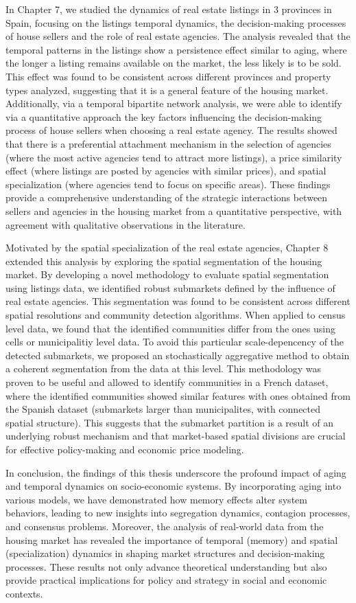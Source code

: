 In Chapter 7, we studied the dynamics of real estate listings in 3 provinces in Spain, focusing on the listings temporal dynamics, the decision-making processes of house sellers and the role of real estate agencies. The analysis revealed that the temporal patterns in the listings show a persistence effect similar to aging, where the longer a listing remains available on the market, the less likely is to be sold. This effect was found to be consistent across different provinces and property types analyzed, suggesting that it is a general feature of the housing market. Additionally, via a temporal bipartite network analysis, we were able to identify via a quantitative approach the key factors influencing the decision-making process of house sellers when choosing a real estate agency. The results showed that there is a preferential attachment mechanism in the selection of agencies (where the most active agencies tend to attract more listings), a price similarity effect (where listings are posted by agencies with similar prices), and spatial specialization (where agencies tend to focus on specific areas). These findings provide a comprehensive understanding of the strategic interactions between sellers and agencies in the housing market from a quantitative perspective, with agreement with qualitative observations in the literature.

Motivated by the spatial specialization of the real estate agencies, Chapter 8 extended this analysis by exploring the spatial segmentation of the housing market. By developing a novel methodology to evaluate spatial segmentation using listings data, we identified robust submarkets defined by the influence of real estate agencies. This segmentation was found to be consistent across different spatial resolutions and community detection algorithms. When applied to census level data, we found that the identified communities differ from the ones using cells or municipalitiy level data. To avoid this particular scale-depencency of the detected submarkets, we proposed an stochastically aggregative method to obtain a coherent segmentation from the data at this level. This methodology was proven to be useful and allowed to identify communities in a French dataset, where the identified communities showed similar features with ones obtained from the Spanish dataset (submarkets larger than municipalites, with connected spatial structure). This suggests that the submarket partition is a result of an underlying robust mechanism and that market-based spatial divisions are crucial for effective policy-making and economic price modeling.

In conclusion, the findings of this thesis underscore the profound impact of aging and temporal dynamics on socio-economic systems. By incorporating aging into various models, we have demonstrated how memory effects alter system behaviors, leading to new insights into segregation dynamics, contagion processes, and consensus problems. Moreover, the analysis of real-world data from the housing market has revealed the importance of temporal (memory) and spatial (specialization) dynamics in shaping market structures and decision-making processes. These results not only advance theoretical understanding but also provide practical implications for policy and strategy in social and economic contexts.
